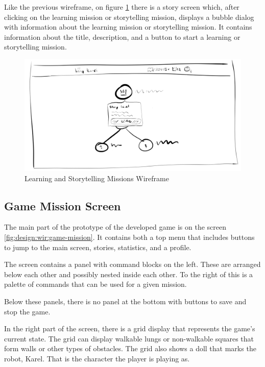 Like the previous wireframe, on figure \ref{fig:design:wir:story-learning} there is a story screen which, after clicking on the learning mission or storytelling mission, displays a bubble dialog with information about the learning mission or storytelling mission.
It contains information about the title, description, and a button to start a learning or storytelling mission.

\begin{figure}
    \centering
    \includegraphics[width=1\linewidth]{assets/design/ui/wir_story.png}
    \caption{Learning and Storytelling Missions Wireframe}
    \label{fig:design:wir:story-learning}
\end{figure}

\subsection{Game Mission Screen}

The main part of the prototype of the developed game is on the screen \ref{fig:design:wir:game-mission}.
It contains both a top menu that includes buttons to jump to the main screen, stories, statistics, and a profile.

The screen contains a panel with command blocks on the left.
These are arranged below each other and possibly nested inside each other.
To the right of this is a palette of commands that can be used for a given mission.

Below these panels, there is no panel at the bottom with buttons to save and stop the game.

In the right part of the screen, there is a grid display that represents the game's current state.
The grid can display walkable lungs or non-walkable squares that form walls or other types of obstacles.
The grid also shows a doll that marks the robot, Karel.
That is the character the player is playing as.

